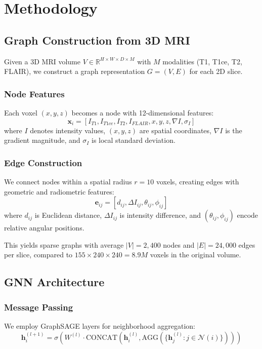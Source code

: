 \documentclass[conference]{IEEEtran}
\begin{document}
\section{Methodology}

\subsection{Graph Construction from 3D MRI}

Given a 3D MRI volume $V \in \mathbb{R}^{H \times W \times D \times M}$ with $M$ modalities (T1, T1ce, T2, FLAIR), we construct a graph representation $G = (V, E)$ for each 2D slice.

\subsubsection{Node Features}
Each voxel $(x, y, z)$ becomes a node with 12-dimensional features:
\begin{equation}
\mathbf{x}_i = [I_{T1}, I_{T1ce}, I_{T2}, I_{FLAIR}, x, y, z, \nabla I, \sigma_I]
\end{equation}
where $I$ denotes intensity values, $(x,y,z)$ are spatial coordinates, $\nabla I$ is the gradient magnitude, and $\sigma_I$ is local standard deviation.

\subsubsection{Edge Construction}
We connect nodes within a spatial radius $r=10$ voxels, creating edges with geometric and radiometric features:
\begin{equation}
\mathbf{e}_{ij} = [d_{ij}, \Delta I_{ij}, \theta_{ij}, \phi_{ij}]
\end{equation}
where $d_{ij}$ is Euclidean distance, $\Delta I_{ij}$ is intensity difference, and $(\theta_{ij}, \phi_{ij})$ encode relative angular positions.

This yields sparse graphs with average $|V| = 2,400$ nodes and $|E| = 24,000$ edges per slice, compared to $155 \times 240 \times 240 = 8.9M$ voxels in the original volume.

\subsection{GNN Architecture}

\subsubsection{Message Passing}
We employ GraphSAGE \cite{hamilton2017} layers for neighborhood aggregation:
\begin{equation}
\mathbf{h}_i^{(l+1)} = \sigma\left(W^{(l)} \cdot \text{CONCAT}\left(\mathbf{h}_i^{(l)}, \text{AGG}(\{\mathbf{h}_j^{(l)} : j \in \mathcal{N}(i)\})\right)\right)
\end{equation}
\end{document}
